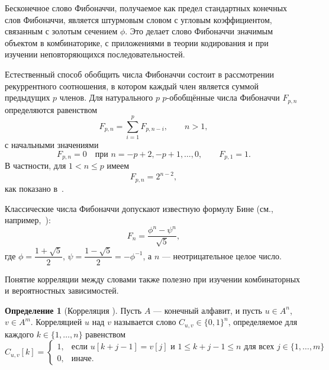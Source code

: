 \documentclass[a4paper,14pt]{extreport}
\theoremstyle{plain}
\theoremstyle{definition}
\newtheorem{definition}{Определение}[section]
\theoremstyle{remark}
\begin{document}
Бесконечное слово Фибоначчи, получаемое как предел стандартных конечных слов Фибоначчи, является штурмовым словом с угловым коэффициентом, связанным с золотым сечением $\phi$. Это делает слово Фибоначчи значимым объектом в комбинаторике, с приложениями в теории кодирования и при изучении неповторяющихся последовательностей.

Естественный способ обобщить числа Фибоначчи состоит в рассмотрении рекуррентного соотношения, в котором каждый член является суммой предыдущих $p$ членов. Для натурального $p$ $p$-обобщённые числа Фибоначчи $F_{p,n}$ определяются равенством
\begin{equation}\label{eq3duaafib}
	F_{p,n} = \sum_{i=1}^{p} F_{p,n-i}, \qquad n > 1,
\end{equation}
с начальными значениями
\begin{equation}
	F_{p,n} = 0 \quad\text{при } n = -p+2,-p+1,\dots,0,
	\qquad
	F_{p,1} = 1.
\end{equation}
В частности, для $1 < n \leq p$ имеем
\begin{equation}
	F_{p,n} = 2^{n-2},
\end{equation}
как показано в~\cite{PulidoRamirez}.

Классические числа Фибоначчи допускают известную формулу Бине (см., например,~\cite{knuth1997}):
\begin{equation}\label{eq4duaafib}
	F_n = \frac{\phi^n - \psi^n}{\sqrt{5}},
\end{equation}
где $\phi = \dfrac{1 + \sqrt{5}}{2}$, $\psi = \dfrac{1 - \sqrt{5}}{2} = -\phi^{-1}$, а $n$ --- неотрицательное целое число.

Понятие корреляции между словами также полезно при изучении комбинаторных и вероятностных зависимостей.

\begin{definition}[Корреляция {\cite{Rampersad2023Wiebe}}]\label{defCorrelation}
	Пусть $A$ --- конечный алфавит, и пусть $u \in A^n$, $v \in A^m$. Корреляцией $u$ над $v$ называется слово $C_{u,v} \in \{0,1\}^n$, определяемое для каждого $k \in \{1,\ldots,n\}$ равенством
	\begin{equation}
		C_{u,v}[k] = 
		\begin{cases}
			1, & \text{если } u[k+j-1] = v[j] \text{ и }  1 \le k + j - 1 \le n  \text{ для всех } j \in \{1,\ldots,m\} \\[1ex]
			0, & \text{иначе}.
		\end{cases}
	\end{equation}
\end{definition}
\end{document}
